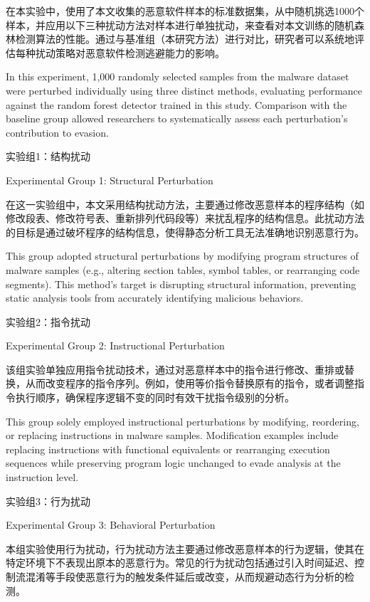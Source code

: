 在本实验中，使用了本文收集的恶意软件样本的标准数据集，从中随机挑选1000个样本，并应用以下三种扰动方法对样本进行单独扰动，来查看对本文训练的随机森林检测算法的性能。通过与基准组（本研究方法）进行对比，研究者可以系统地评估每种扰动策略对恶意软件检测逃避能力的影响。

In this experiment, 1,000 randomly selected samples from the malware dataset were perturbed individually using three distinct methods, evaluating performance against the random forest detector trained in this study. Comparison with the baseline group allowed researchers to systematically assess each perturbation's contribution to evasion.

实验组1：结构扰动

Experimental Group 1: Structural Perturbation

在这一实验组中，本文采用结构扰动方法，主要通过修改恶意样本的程序结构（如修改段表、修改符号表、重新排列代码段等）来扰乱程序的结构信息。此扰动方法的目标是通过破坏程序的结构信息，使得静态分析工具无法准确地识别恶意行为。

This group adopted structural perturbations by modifying program structures of malware samples (e.g., altering section tables, symbol tables, or rearranging code segments). This method's target is disrupting structural information, preventing static analysis tools from accurately identifying malicious behaviors.

实验组2：指令扰动

Experimental Group 2: Instructional Perturbation

该组实验单独应用指令扰动技术，通过对恶意样本中的指令进行修改、重排或替换，从而改变程序的指令序列。例如，使用等价指令替换原有的指令，或者调整指令执行顺序，确保程序逻辑不变的同时有效干扰指令级别的分析。

This group solely employed instructional perturbations by modifying, reordering, or replacing instructions in malware samples. Modification examples include replacing instructions with functional equivalents or rearranging execution sequences while preserving program logic unchanged to evade analysis at the instruction level.

实验组3：行为扰动

Experimental Group 3: Behavioral Perturbation

本组实验使用行为扰动，行为扰动方法主要通过修改恶意样本的行为逻辑，使其在特定环境下不表现出原本的恶意行为。常见的行为扰动包括通过引入时间延迟、控制流混淆等手段使恶意行为的触发条件延后或改变，从而规避动态行为分析的检测。

